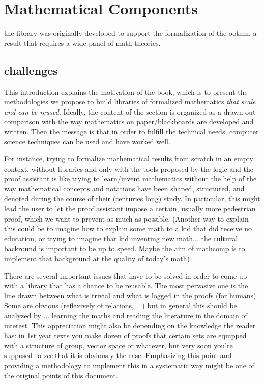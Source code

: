 \setcounter{chapter}{-1}
\chapter{Mathematical Components}

the library was originally developed to support the formalization
of the oothm, a result that requires a wide panel of math theories.

\section{challenges}




This introduction explains the motivation of the book, which is to
present the methodologies we propose to build libraries of formalized
mathematics \emph{that scale and can be reused}. Ideally, the content
of the section is organized as a drawn-out comparison with the way
mathematics on paper/blackboards are developed and written. Then the
message is that in order to fulfill the technical needs, computer
science techniques can be used and have worked well.

For instance, trying to formalize mathematical results from scratch in
an empty context, without libraries and only with the tools proposed
by the logic and the proof assistant is like trying to learn/invent
mathematics without the help of the way mathematical concepts and
notations have been shaped, structured, and denoted during the course
of their (centuries long) study.
In particular, this might lead the user to let the
proof assistant impose a certain, usually more pedestrian proof, which
we want to prevent as much as possible.
(Another way to explain this could be to imagine how to explain some math
to a kid that did receive no education, or trying to imagine that kid
inventing new math... the cultural backround is important to be up to
speed. Maybe the aim of mathcomp is to implement that background at the
quality of today's math).

There are several important issues that have to be solved in order to
come up with a library that has a chance to be reusable. The most
pervasive one is the line drawn between what is trivial and what is
logged in the proofs (for humans). Some are obvious (reflexively of
relations, ...) but in general this should be analyzed by
... learning the maths and reading the literature in the domain of
interest. This appreciation might also be depending on the knowledge
the reader has: in 1st year texts you make dozen of proofs that
certain sets are equipped with a structure of group, vector space or
whatever, but very soon you're supposed to \emph{see} that it is
obviously the case. Emphasizing this point and providing a methodology to
implement this in a systematic way might be one of the original points
of this document. 

